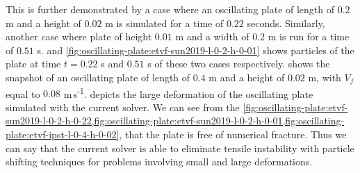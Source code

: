 This is further demonstrated by a case where an oscillating plate of length of
$0.2$ m and a height of $0.02$ m is simulated for a time of $0.22$ seconds.
Similarly, another case where plate of height $0.01$ m and a width of $0.2$ m is
run for a time of $0.51$ s.
 and
\cref{fig:oscillating-plate:etvf-sun2019-l-0-2-h-0-01} shows particles of the
plate at time $t=0.22$ s and $0.51$ s of these two cases respectively.
 shows the snapshot of an
oscillating plate of length of $0.4$ m and a height of $0.02$ m, with $V_f$
equal to $0.08$ m\,s\textsuperscript{-1}.
 depicts the large
deformation of the oscillating plate simulated with the current solver. We can
see from the
\cref{fig:oscillating-plate:etvf-sun2019-l-0-2-h-0-22,fig:oscillating-plate:etvf-sun2019-l-0-2-h-0-01,fig:oscillating-plate:etvf-ipst-l-0-4-h-0-02},
that the plate is free of numerical fracture. Thus we can say that the current
solver is able to eliminate tensile instability with particle shifting
techniques for problems involving small and large deformations.

